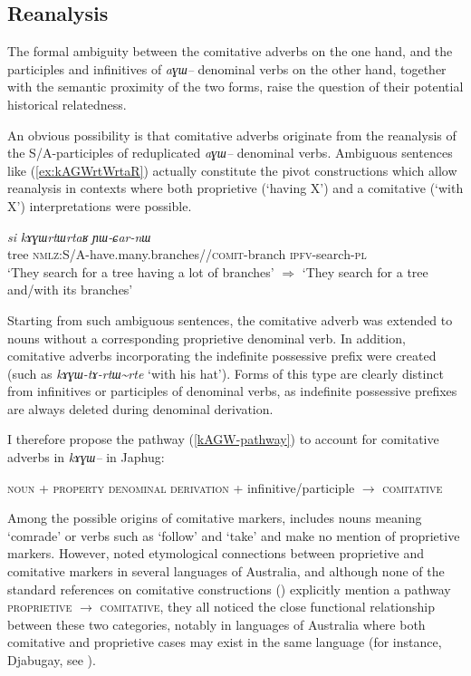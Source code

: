 \documentclass[oldfontcommands,oneside,a4paper,11pt]{article}
\newcommand{\ipa}[1]{{\phon\textit{#1}}} %
\newcommand{\tld}{\textasciitilde{}}
\begin{document}
\subsection{Reanalysis}
The formal ambiguity between the comitative adverbs on the one hand, and the participles and infinitives of \ipa{aɣɯ--} denominal verbs on the other hand, together with the semantic proximity of the two forms, raise the question of their potential historical relatedness.

An obvious possibility is that comitative adverbs originate from the reanalysis of the S/A-participles of reduplicated \ipa{aɣɯ--} denominal verbs. Ambiguous sentences like (\ref{ex:kAGWrtWrtaR}) actually constitute the pivot constructions which allow reanalysis in contexts where both proprietive (`having X') and a comitative (`with X') interpretations were possible.


  \begin{exe}
\ex \label{ex:kAGWrtWrtaR2}
\gll   
  \ipa{si} 	\ipa{kɤɣɯrtɯrtaʁ} \ipa{ɲɯ-ɕar-nɯ} \\
  tree \textsc{nmlz}:S/A-have.many.branches//\textsc{comit}-branch \textsc{ipfv}-search-\textsc{pl} \\
\glt `They search for a tree having a lot of branches' $\Rightarrow$ `They search for a tree and/with its branches'
\end{exe}

Starting from such ambiguous sentences, the comitative adverb was extended to nouns without a corresponding proprietive denominal verb. In addition, comitative adverbs incorporating the indefinite possessive prefix were created (such as \ipa{kɤɣɯ-tɤ-rtɯ\tld{}rte} `with his hat'). Forms of this type are clearly distinct from infinitives or participles of denominal verbs, as indefinite possessive prefixes are always deleted during  denominal derivation.


I therefore propose the pathway (\ref{kAGW-pathway}) to account for comitative adverbs in \ipa{kɤɣɯ--} in Japhug:

 \begin{exe}
\ex \label{kAGW-pathway}
 \glt  \textsc{noun} + \textsc{property denominal derivation} + infinitive/participle $\rightarrow$ \textsc{comitative}
\end{exe} 

Among the possible origins of comitative markers,  \citet[91, 139, 287]{heine-kuteva02} includes nouns meaning `comrade' or verbs such as `follow' and `take' and make no mention of proprietive markers. However, \citet{sutton76having} noted etymological connections between proprietive and comitative markers in several languages of Australia, and although none of the standard references on comitative constructions (\citealt{stassen00and, stolz06comitative, arkhipov09comitative}) explicitly mention a pathway \textsc{proprietive} $\rightarrow$ \textsc{comitative}, they all noticed the close functional relationship between these two categories, notably in languages of Australia where both comitative and proprietive cases may exist in the same language (for instance, Djabugay, see \citealt{patz91djabugay}).
 
\end{document}
